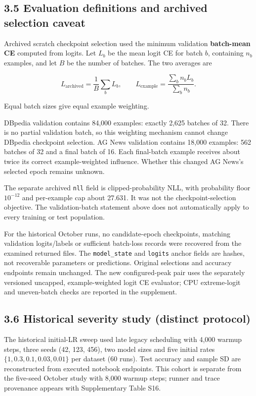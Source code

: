 \documentclass[smallextended]{svjour3}
\begin{document}
\subsection{3.5 Evaluation definitions and archived selection caveat}\label{evaluation-definitions-and-archived-selection-caveat}

Archived scratch checkpoint selection used the minimum validation \textbf{batch-mean CE} computed from logits. Let \(L_b\) be the mean logit CE for batch \(b\), containing \(n_b\) examples, and let \(B\) be the number of batches. The two averages are

\[
L_{\mathrm{archived}}=\frac{1}{B}\sum_b L_b,\qquad L_{\mathrm{example}}=\frac{\sum_b n_b L_b}{\sum_b n_b}.
\]

Equal batch sizes give equal example weighting.

DBpedia validation contains 84,000 examples: exactly 2,625 batches of 32. There is no partial validation batch, so this weighting mechanism cannot change DBpedia checkpoint selection. AG News validation contains 18,000 examples: 562 batches of 32 and a final batch of 16. Each final-batch example receives about twice its correct example-weighted influence. Whether this changed AG News's selected epoch remains unknown.

The separate archived \texttt{nll} field is clipped-probability NLL, with probability floor \(10^{-12}\) and per-example cap about 27.631. It was not the checkpoint-selection objective. The validation-batch statement above does not automatically apply to every training or test population.

For the historical October runs, no candidate-epoch checkpoints, matching validation logits/labels or sufficient batch-loss records were recovered from the examined returned files. The \texttt{model\_state} and \texttt{logits} anchor fields are hashes, not recoverable parameters or predictions. Original selections and accuracy endpoints remain unchanged. The new configured-peak pair uses the separately versioned uncapped, example-weighted logit CE evaluator; CPU extreme-logit and uneven-batch checks are reported in the supplement.

\subsection{3.6 Historical severity study (distinct protocol)}\label{historical-severity-study-distinct-protocol}

The historical initial-LR sweep used late legacy scheduling with 4,000 warmup steps, three seeds (42, 123, 456), two model sizes and five initial rates \(\{1,0.3,0.1,0.03,0.01\}\) per dataset (60 runs). Test accuracy and sample SD are reconstructed from executed notebook endpoints. This cohort is separate from the five-seed October study with 8,000 warmup steps; runner and trace provenance appears with Supplementary Table S16.
\end{document}
